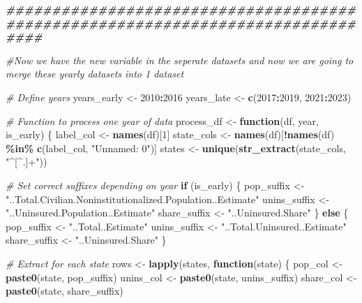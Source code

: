\documentclass[
]{article}
\newenvironment{Shaded}{\begin{snugshade}}{\end{snugshade}}
\newcommand{\CommentTok}[1]{\textcolor[rgb]{0.56,0.35,0.01}{\textit{#1}}}
\newcommand{\ControlFlowTok}[1]{\textcolor[rgb]{0.13,0.29,0.53}{\textbf{#1}}}
\newcommand{\DecValTok}[1]{\textcolor[rgb]{0.00,0.00,0.81}{#1}}
\newcommand{\DocumentationTok}[1]{\textcolor[rgb]{0.56,0.35,0.01}{\textbf{\textit{#1}}}}
\newcommand{\FunctionTok}[1]{\textcolor[rgb]{0.13,0.29,0.53}{\textbf{#1}}}
\newcommand{\NormalTok}[1]{#1}
\newcommand{\OtherTok}[1]{\textcolor[rgb]{0.56,0.35,0.01}{#1}}
\newcommand{\SpecialCharTok}[1]{\textcolor[rgb]{0.81,0.36,0.00}{\textbf{#1}}}
\newcommand{\StringTok}[1]{\textcolor[rgb]{0.31,0.60,0.02}{#1}}
\begin{document}
\begin{Shaded}
\begin{Highlighting}[]
\DocumentationTok{\#\#\#\#\#\#\#\#\#\#\#\#\#\#\#\#\#\#\#\#\#\#\#\#\#\#\#\#\#\#\#\#\#\#\#\#\#\#\#\#\#\#\#\#\#\#\#\#\#\#\#\#\#\#\#\#\#\#\#\#\#\#\#\#\#\#\#\#\#\#\#\#\#\#\#\#\#\#\#\#}

\CommentTok{\#Now we have the new variable in the seperate datasets and now we are going to merge these yearly datasets into 1 dataset}

\CommentTok{\# Define years}
\NormalTok{years\_early }\OtherTok{\textless{}{-}} \DecValTok{2010}\SpecialCharTok{:}\DecValTok{2016}
\NormalTok{years\_late }\OtherTok{\textless{}{-}} \FunctionTok{c}\NormalTok{(}\DecValTok{2017}\SpecialCharTok{:}\DecValTok{2019}\NormalTok{, }\DecValTok{2021}\SpecialCharTok{:}\DecValTok{2023}\NormalTok{)}

\CommentTok{\# Function to process one year of data}
\NormalTok{process\_df }\OtherTok{\textless{}{-}} \ControlFlowTok{function}\NormalTok{(df, year, is\_early) \{}
\NormalTok{  label\_col }\OtherTok{\textless{}{-}} \FunctionTok{names}\NormalTok{(df)[}\DecValTok{1}\NormalTok{]}
\NormalTok{  state\_cols }\OtherTok{\textless{}{-}} \FunctionTok{names}\NormalTok{(df)[}\SpecialCharTok{!}\FunctionTok{names}\NormalTok{(df) }\SpecialCharTok{\%in\%} \FunctionTok{c}\NormalTok{(label\_col, }\StringTok{"Unnamed: 0"}\NormalTok{)]}
\NormalTok{  states }\OtherTok{\textless{}{-}} \FunctionTok{unique}\NormalTok{(}\FunctionTok{str\_extract}\NormalTok{(state\_cols, }\StringTok{"\^{}[\^{}.]+"}\NormalTok{))}
  
  \CommentTok{\# Set correct suffixes depending on year}
  \ControlFlowTok{if}\NormalTok{ (is\_early) \{}
\NormalTok{    pop\_suffix }\OtherTok{\textless{}{-}} \StringTok{"..Total.Civilian.Noninstitutionalized.Population..Estimate"}
\NormalTok{    unins\_suffix }\OtherTok{\textless{}{-}} \StringTok{"..Uninsured.Population..Estimate"}
\NormalTok{    share\_suffix }\OtherTok{\textless{}{-}} \StringTok{"..Uninsured.Share"}
\NormalTok{  \} }\ControlFlowTok{else}\NormalTok{ \{}
\NormalTok{    pop\_suffix }\OtherTok{\textless{}{-}} \StringTok{"..Total..Estimate"}
\NormalTok{    unins\_suffix }\OtherTok{\textless{}{-}} \StringTok{"..Total.Uninsured..Estimate"}
\NormalTok{    share\_suffix }\OtherTok{\textless{}{-}} \StringTok{"..Uninsured.Share"}
\NormalTok{  \}}
  
  \CommentTok{\# Extract for each state}
\NormalTok{  rows }\OtherTok{\textless{}{-}} \FunctionTok{lapply}\NormalTok{(states, }\ControlFlowTok{function}\NormalTok{(state) \{}
\NormalTok{    pop\_col }\OtherTok{\textless{}{-}} \FunctionTok{paste0}\NormalTok{(state, pop\_suffix)}
\NormalTok{    unins\_col }\OtherTok{\textless{}{-}} \FunctionTok{paste0}\NormalTok{(state, unins\_suffix)}
\NormalTok{    share\_col }\OtherTok{\textless{}{-}} \FunctionTok{paste0}\NormalTok{(state, share\_suffix)}
    

\end{Highlighting}
\end{Shaded}
\end{document}
